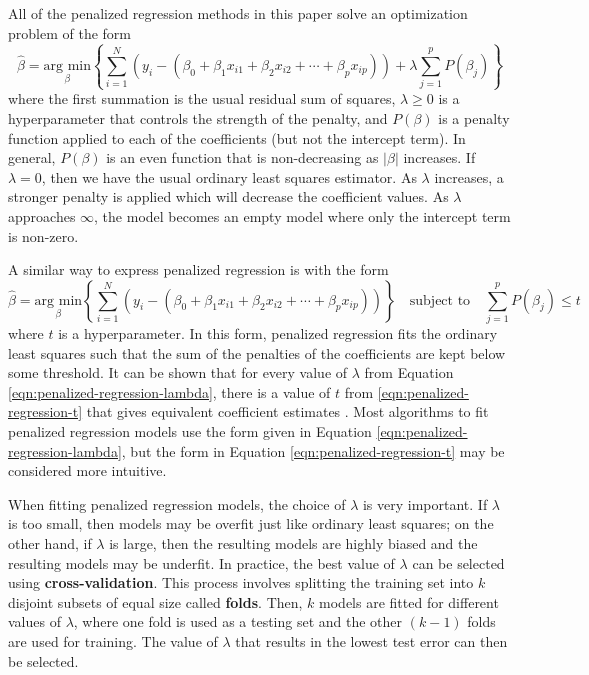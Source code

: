 \documentclass{article}
\newcommand{\argmin}[2]{\underset{#1}{\text{arg min}}\left\{#2\right\}}
\begin{document}
All of the penalized regression methods in this paper solve an optimization problem of the form
\begin{equation}\label{eqn:penalized-regression-lambda}
	\hat{\beta}=\argmin{\beta}{\sum\limits_{i = 1}^N(y_i - (\beta_0 + \beta_1 x_{i1} + \beta_2 x_{i2} + \cdots + \beta_p x_{ip})) + \lambda\sum\limits_{j = 1}^p P(\beta_j)}
\end{equation}
where the first summation is the usual residual sum of squares, $\lambda\geq 0$ is a hyperparameter that controls the strength of the penalty, and $P(\beta)$ is a penalty function applied to each of the coefficients (but not the intercept term). In general, $P(\beta)$ is an even function that is non-decreasing as $\vert \beta \vert$ increases. If $\lambda = 0$, then we have the usual ordinary least squares estimator. As $\lambda$ increases, a stronger penalty is applied which will decrease the coefficient values. As $\lambda$ approaches $\infty$, the model becomes an empty model where only the intercept term is non-zero.

A similar way to express penalized regression is with the form
\begin{equation}\label{eqn:penalized-regression-t}
	\hat{\beta} = \argmin{\beta}{\sum\limits_{i = 1}^N(y_i - (\beta_0 + \beta_1 x_{i1} + \beta_2 x_{i2} + \cdots + \beta_p x_{ip}))} \quad \text{subject to} \quad \sum\limits_{j = 1}^p P(\beta_j)\leq t
\end{equation}
where $t$ is a hyperparameter. In this form, penalized regression fits the ordinary least squares such that the sum of the penalties of the coefficients are kept below some threshold. It can be shown that for every value of $\lambda$ from Equation \ref{eqn:penalized-regression-lambda}, there is a value of $t$ from \ref{eqn:penalized-regression-t} that gives equivalent coefficient estimates \cite{james2013introduction}. Most algorithms to fit penalized regression models use the form given in Equation \ref{eqn:penalized-regression-lambda}, but the form in Equation \ref{eqn:penalized-regression-t} may be considered more intuitive.

When fitting penalized regression models, the choice of $\lambda$ is very important. If $\lambda$ is too small, then models may be overfit just like ordinary least squares; on the other hand, if $\lambda$ is large, then the resulting models are highly biased and the resulting models may be underfit. In practice, the best value of $\lambda$ can be selected using \textbf{cross-validation}. This process involves splitting the training set into $k$ disjoint subsets of equal size called \textbf{folds}. Then, $k$ models are fitted for different values of $\lambda$, where one fold is used as a testing set and the other $(k - 1)$ folds are used for training. The value of $\lambda$ that results in the lowest test error can then be selected.
\end{document}
